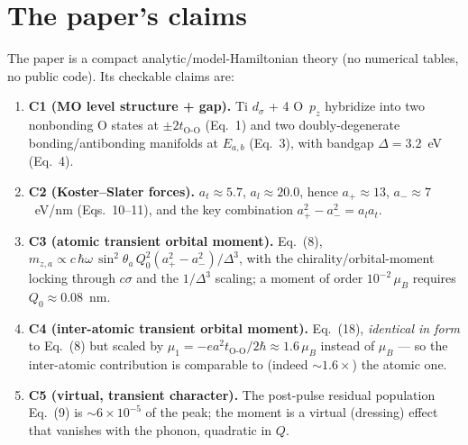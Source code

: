 \documentclass[11pt]{article}
\begin{document}
\section{The paper's claims}
The paper is a compact analytic/model-Hamiltonian theory (no numerical tables, no
public code). Its checkable claims are:
\begin{enumerate}
\item \textbf{C1 (MO level structure + gap).} Ti $d_\sigma$ + 4 O~$p_z$ hybridize into
two nonbonding O states at $\pm 2t_{\mathrm{O\text{-}O}}$ (Eq.~1) and two doubly-degenerate
bonding/antibonding manifolds at $E_{a,b}$ (Eq.~3), with bandgap $\Delta=3.2$~eV (Eq.~4).
\item \textbf{C2 (Koster--Slater forces).} $a_t\approx5.7$, $a_l\approx20.0$, hence
$a_+\approx13$, $a_-\approx7$~eV/nm (Eqs.~10--11), and the key combination
$a_+^2-a_-^2 = a_l a_t$.
\item \textbf{C3 (atomic transient orbital moment).} Eq.~(8),
$m_{z,a}\propto c\,\hbar\omega\,\sin^2\theta_a\,Q_0^2(a_+^2-a_-^2)/\Delta^3$,
with the chirality/orbital-moment locking through $c\sigma$ and the $1/\Delta^3$ scaling;
a moment of order $10^{-2}\,\mu_B$ requires $Q_0\approx0.08$~nm.
\item \textbf{C4 (inter-atomic transient orbital moment).} Eq.~(18), \emph{identical in form}
to Eq.~(8) but scaled by $\mu_1=-ea^2 t_{\mathrm{O\text{-}O}}/2\hbar\approx1.6\,\mu_B$
instead of $\mu_B$ --- so the inter-atomic contribution is comparable to (indeed $\sim1.6\times$)
the atomic one.
\item \textbf{C5 (virtual, transient character).} The post-pulse residual population Eq.~(9)
is $\sim6\times10^{-5}$ of the peak; the moment is a virtual (dressing) effect that vanishes
with the phonon, quadratic in $Q$.
\end{enumerate}
\end{document}
